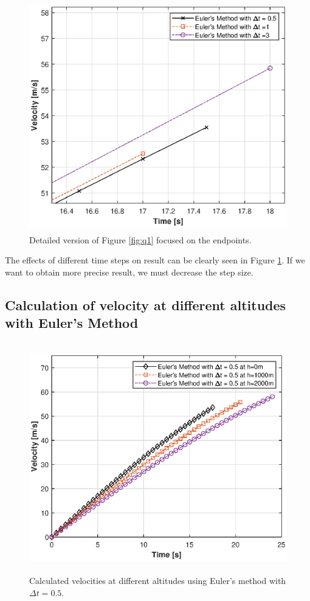 \documentclass[letterpaper,12pt]{article}
\begin{document}
\newpage
\begin{figure}[ht]
        \centering \includegraphics[max height=10cm]{graphs/question1_finaltime.eps}
        \caption{Detailed version of Figure \ref{fig:q1} focused on the endpoints.}
        \label{fig:q1_closer}
\end{figure}

 The effects of different time steps on result can be clearly seen in Figure \ref{fig:q1_closer}. If we want to obtain
 more precise result, we must decrease the step size.
\newpage
\subsection{Calculation of velocity at different altitudes with Euler's Method }
\begin{figure}[ht]
        \centering \includegraphics[max height=10cm]{graphs/altitude.eps}
        \caption{Calculated velocities at different altitudes using Euler's method with $\Delta t = 0.5$.}
        \label{fig:altitude}
\end{figure}
\end{document}
